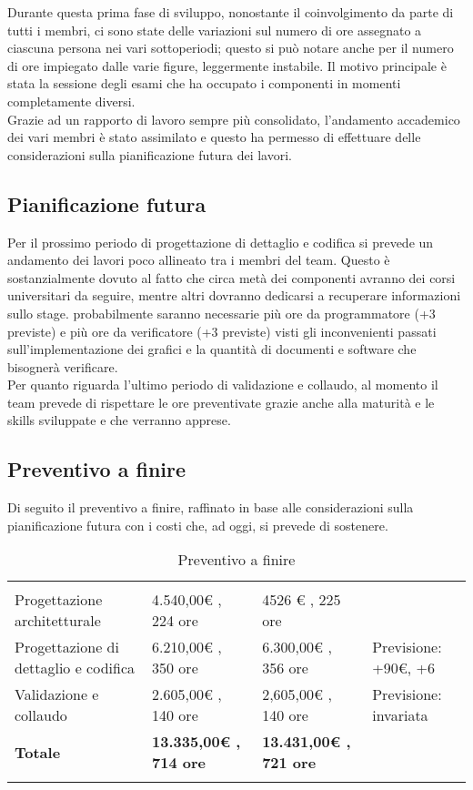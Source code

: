 Durante questa prima fase di sviluppo, nonostante il coinvolgimento da parte di tutti i membri, ci sono state delle variazioni sul numero di ore assegnato a ciascuna persona nei vari sottoperiodi; questo si può notare anche per il numero di ore impiegato dalle varie figure, leggermente instabile. Il motivo principale è stata la sessione degli esami che ha occupato i componenti in momenti completamente diversi.\\ Grazie ad un rapporto di lavoro sempre più consolidato, l'andamento accademico dei vari membri è stato assimilato e questo ha permesso di effettuare delle considerazioni sulla pianificazione futura dei lavori.

\subsection{Pianificazione futura}

Per il prossimo periodo di progettazione di dettaglio e codifica si prevede un andamento dei lavori poco allineato tra i membri del team. Questo è sostanzialmente dovuto al fatto che circa metà dei componenti avranno dei corsi universitari da seguire, mentre altri dovranno dedicarsi a recuperare informazioni sullo stage. probabilmente saranno necessarie più ore da programmatore (+3 previste) e più ore da verificatore (+3 previste) visti gli inconvenienti passati sull'implementazione dei grafici e la quantità di documenti e software che bisognerà verificare. \\ Per quanto riguarda l'ultimo periodo di validazione e collaudo, al momento il team prevede di rispettare le ore preventivate grazie anche alla maturità e le skills sviluppate e che verranno apprese.

\subsection{Preventivo a finire}
Di seguito il preventivo a finire, raffinato in base alle considerazioni sulla pianificazione futura con i costi che, ad oggi, si prevede di sostenere.
{
\begin{longtable}{ C{3.5cm} | C{5cm} | C{5cm} | C{2cm}} 
 	 &
 	 &
 	 & 
 	 \\
 	
 	Progettazione architetturale & 4.540,00€ , 224 ore & 4526 € , 225 ore & \begin{LARGE}\redcheck \end{LARGE}\\
 	Progettazione di dettaglio e codifica & 6.210,00€ , 350 ore & 6.300,00€ , 356 ore & Previsione: +90€, +6\\
 	Validazione e collaudo & 2.605,00€ , 140 ore  & 2,605,00€ , 140 ore   & Previsione: invariata\\
 	\textbf{Totale} & \textbf{13.335,00€ , 714 ore} & \textbf{13.431,00€ , 721 ore} &  \\
 	
 	\caption{Preventivo a finire}
\end{longtable}
}

\newpage
